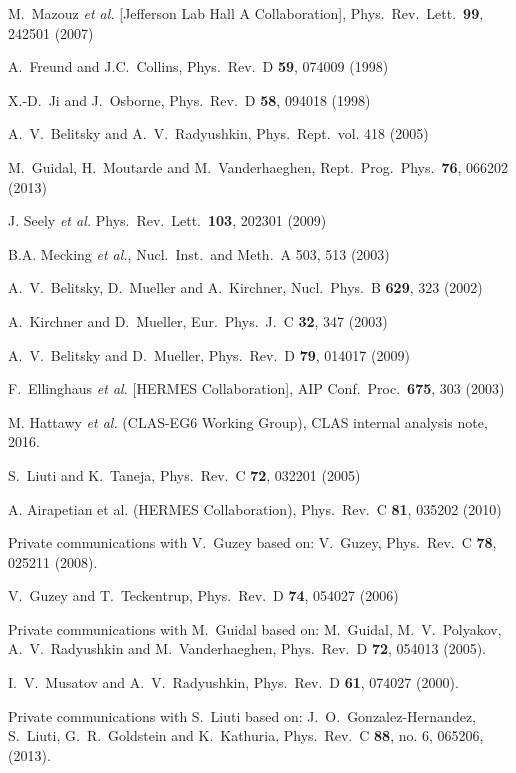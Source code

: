 \documentclass[nofootinbib,twocolumn,showpacs,prl,superscriptaddress,secnumarabic,amssymb,nobibnotes,aps,floatfix]{revtex4}
\begin{document}
\begin{thebibliography}{99}
  M.~Mazouz {\it et al.} [Jefferson Lab Hall A Collaboration],
   Phys.\ Rev.\ Lett.\  {\bf 99}, 242501 (2007)

A.~Freund and J.C.~Collins, 
Phys.\ Rev.\ D {\bf 59}, 074009 (1998)

X.-D.~Ji and J.~Osborne, 
Phys.\ Rev.\ D {\bf 58}, 094018 (1998)

A.~V.~Belitsky and A.~V.~Radyushkin, 
Phys.\ Rept.\ vol. 418 (2005)

M.~Guidal, H.~Moutarde and M.~Vanderhaeghen,
Rept.\ Prog.\ Phys.\  {\bf 76}, 066202 (2013)

J. Seely {\it et al.} 
Phys.\ Rev.\ Lett.\ {\bf 103}, 202301 (2009)

B.A. Mecking {\it et al.}, 
Nucl.\ Inst.\ and Meth.\ A 503, 513 (2003)

A.~V.~Belitsky, D.~Mueller and A.~Kirchner,
Nucl.\ Phys.\ B {\bf 629}, 323 (2002)

A.~Kirchner and D.~Mueller, 
Eur.\ Phys.\ J.\ C {\bf 32}, 347 (2003)

A.~V.~Belitsky and D.~Mueller,
Phys.\ Rev.\ D {\bf 79}, 014017 (2009)


F.~Ellinghaus {\it et al.} [HERMES Collaboration],
AIP Conf.\ Proc.\  {\bf 675}, 303 (2003)

M. Hattawy {\it et al.} (CLAS-EG6 Working Group), 
CLAS internal analysis note, 2016.

S.~Liuti and K.~Taneja, 
Phys.\ Rev.\ C {\bf 72}, 032201 (2005)

A. Airapetian et al. (HERMES Collaboration), 
Phys.\ Rev.\ C {\bf 81}, 035202 (2010)

Private communications with V.~Guzey based on: 
V.~Guzey, Phys.\ Rev.\ C {\bf 78}, 025211 (2008).

V.~Guzey and T.~Teckentrup,
Phys.\ Rev.\ D {\bf 74}, 054027 (2006)

Private communications with M.~Guidal based on: 
M.~Guidal, M.~V.~Polyakov, A.~V.~Radyushkin and M.~Vanderhaeghen, 
Phys.\ Rev.\ D {\bf 72}, 054013 (2005).

I.~V.~Musatov and A.~V.~Radyushkin, 
Phys.\ Rev.\ D {\bf 61}, 074027 (2000).

Private communications with S.~Liuti based on: 
J.~O.~Gonzalez-Hernandez, S.~Liuti, G.~R.~Goldstein and K.~Kathuria,
Phys.\ Rev.\ C {\bf 88}, no. 6, 065206, (2013).


\end{thebibliography}
\end{document}
